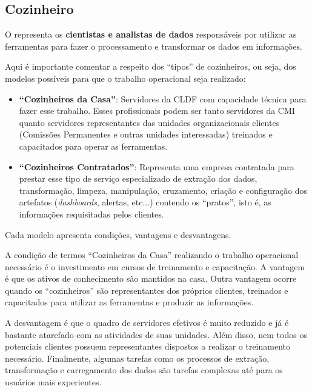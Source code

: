 \subsection*{Cozinheiro}
\label{sub-cozinheiro}

    O \COZINHEIRO \xspace representa os \textbf{cientistas e analistas de dados} responsáveis por utilizar as ferramentas para fazer o processamento e transformar os dados em informações.
    
    Aqui é importante comentar a respeito dos ``tipos'' de cozinheiros, ou seja, dos modelos possíveis para que o trabalho operacional seja realizado:
    
    \begin{itemize}
        \item \textbf{``Cozinheiros da Casa''}: Servidores da CLDF com capacidade técnica para fazer esse trabalho. Esses profissionais podem ser tanto servidores da CMI quanto servidores representantes das unidades organizacionais clientes (Comissões Permanentes e outras unidades interessadas) treinados e capacitados para operar as ferramentas. 

        \item \textbf{``Cozinheiros Contratados''}: Representa uma empresa contratada para prestar esse tipo de serviço especializado de extração dos dados, transformação, limpeza, manipulação, cruzamento, criação e configuração dos artefatos (\emph{dashboards}, alertas, etc...) contendo os ``pratos'', isto é, as informações requisitadas pelos clientes.
    \end{itemize}

    Cada modelo apresenta condições, vantagens e desvantagens.
    
    A condição de termos ``Cozinheiros da Casa'' realizando o trabalho operacional necessário é o investimento em cursos de treinamento e capacitação. A vantagem é que os
    ativos de conhecimento são mantidos na casa. Outra vantagem ocorre quando os ``cozinheiros'' são representantes dos próprios clientes, treinados e capacitados para utilizar as ferramentas e produzir as informações. 
    
    A desvantagem é que o quadro de servidores efetivos é muito reduzido e já é bastante atarefado com as atividades de suas unidades. Além disso, nem todos os potenciais clientes possuem representantes dispostos a realizar o treinamento necessário. Finalmente, algumas tarefas como os processos de extração, transformação e carregamento dos dados são tarefas complexas até para os usuários mais experientes. 
    
